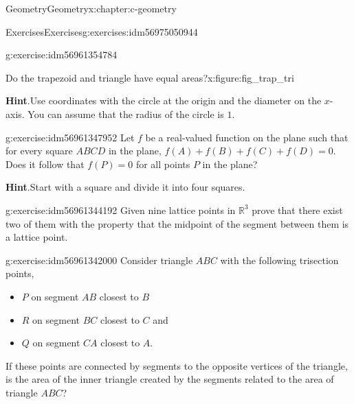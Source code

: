 \documentclass[twoside,10pt,]{book}
\newcommand{\blocktitlefont}{\relax}
\numberwithin{equation}{section}
\begin{document}
\begin{chapterptx}{Geometry}{}{Geometry}{}{}{x:chapter:c-geometry}
\begin{exercises-section}{Exercises}{}{Exercises}{}{}{g:exercises:idm56975050944}
\begin{divisionexercise}{9}{}{}{g:exercise:idm56961354784}
\begin{figureptx}{Do the trapezoid and triangle have equal areas?}{x:figure:fig_trap_tri}{}
\begin{image}{0.2}{0.6}{0.2}
\end{image}%
\tcblower
\end{figureptx}%
\par\smallskip%
\noindent\textbf{\blocktitlefont Hint}.\hypertarget{g:hint:idm56961349008}{}\quad{}Use coordinates with the circle at the origin and the diameter on the \(x\)-axis.  You can assume that the radius of the circle is \(1\).%
\end{divisionexercise}%
\begin{divisionexercise}{10}{}{}{g:exercise:idm56961347952}%
Let \(f\) be a real-valued function on the plane such that for every square \(ABCD\) in the plane, \(f(A) + f(B) + f(C) + f(D) = 0\). Does it follow that \(f(P) = 0\) for all points \(P\) in the plane?%
\par\smallskip%
\noindent\textbf{\blocktitlefont Hint}.\hypertarget{g:hint:idm56961347152}{}\quad{}Start with a square and divide it into four squares.%
\end{divisionexercise}%
\begin{divisionexercise}{11}{}{}{g:exercise:idm56961344192}%
Given nine lattice points in \(\mathbb{R}^3\) prove that there exist two of them with the property that the midpoint of the segment between them is a lattice point.%
\end{divisionexercise}%
\begin{divisionexercise}{12}{}{}{g:exercise:idm56961342000}%
Consider triangle \(ABC\) with the following trisection points,%
\begin{itemize}[label=\textbullet]
\item{}\(P\) on segment \(AB\) closest to \(B\)%
\item{}\(R\) on segment \(BC\) closest to \(C\) and%
\item{}\(Q\) on segment \(CA\) closest to \(A\).%
\end{itemize}
If these points are connected by segments to the opposite vertices of the triangle, is the area of the inner triangle created by the segments related to the area of triangle \(ABC\)?%
\end{divisionexercise}%
\end{exercises-section}
\end{chapterptx}
%
%
\typeout{************************************************}
\typeout{************************************************}
%
\end{document}
